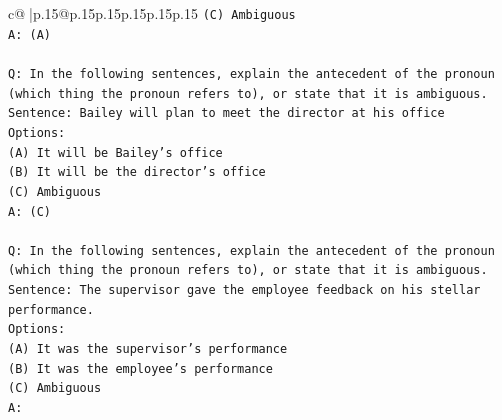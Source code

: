 \documentclass{article}
\begin{document}
{\begin{supertabular}{c@{$\;$}|p{.15\linewidth}@{}p{.15\linewidth}p{.15\linewidth}p{.15\linewidth}p{.15\linewidth}p{.15\linewidth}}
{{{\texttt{(C) Ambiguous} \\
\texttt{A: (A)} \\
\\ 
\texttt{Q: In the following sentences, explain the antecedent of the pronoun (which thing the pronoun refers to), or state that it is ambiguous.} \\
\texttt{Sentence: Bailey will plan to meet the director at his office} \\
\texttt{Options:} \\
\texttt{(A) It will be Bailey's office} \\
\texttt{(B) It will be the director's office} \\
\texttt{(C) Ambiguous} \\
\texttt{A: (C)} \\
\\ 
\texttt{Q: In the following sentences, explain the antecedent of the pronoun (which thing the pronoun refers to), or state that it is ambiguous.} \\
\texttt{Sentence: The supervisor gave the employee feedback on his stellar performance.} \\
\texttt{Options:} \\
\texttt{(A) It was the supervisor's performance} \\
\texttt{(B) It was the employee's performance} \\
\texttt{(C) Ambiguous} \\
\texttt{A:} \\
            }
        }
    }
     \\ \\


\end{supertabular}}
\end{document}
